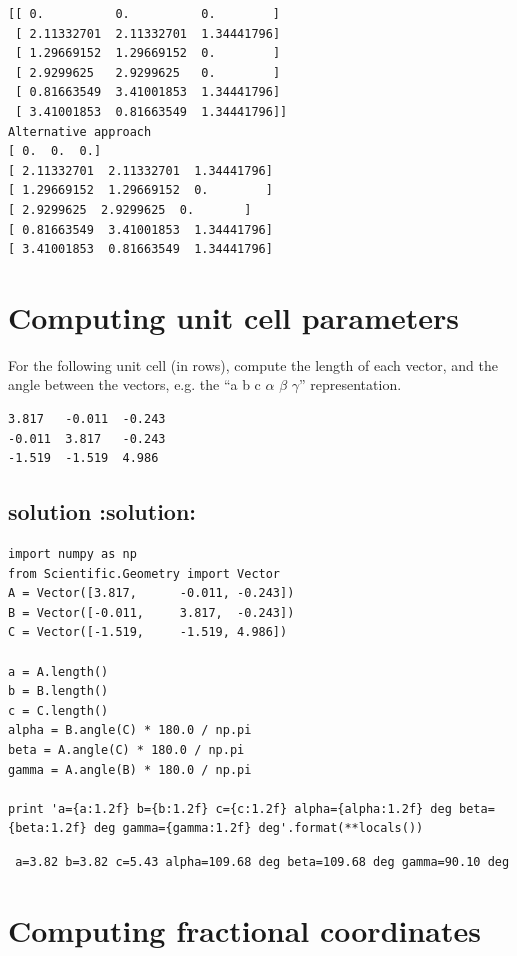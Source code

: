 \documentclass{article}
\begin{document}
\begin{verbatim}
[[ 0.          0.          0.        ]
 [ 2.11332701  2.11332701  1.34441796]
 [ 1.29669152  1.29669152  0.        ]
 [ 2.9299625   2.9299625   0.        ]
 [ 0.81663549  3.41001853  1.34441796]
 [ 3.41001853  0.81663549  1.34441796]]
Alternative approach
[ 0.  0.  0.]
[ 2.11332701  2.11332701  1.34441796]
[ 1.29669152  1.29669152  0.        ]
[ 2.9299625  2.9299625  0.       ]
[ 0.81663549  3.41001853  1.34441796]
[ 3.41001853  0.81663549  1.34441796]
\end{verbatim}
\section{Computing unit cell parameters}
\label{sec-4}

For the following unit cell (in rows), compute the length of each vector, and the angle between the vectors, e.g. the ``a b c $\alpha$ $\beta$ $\gamma$'' representation. 


\begin{verbatim}
3.817   -0.011  -0.243
-0.011  3.817   -0.243
-1.519  -1.519  4.986
\end{verbatim}
\subsection{solution \textbf{:solution:}}
\label{sec-4-1}


\begin{verbatim}
import numpy as np
from Scientific.Geometry import Vector
A = Vector([3.817,      -0.011, -0.243])
B = Vector([-0.011,     3.817,  -0.243])
C = Vector([-1.519,     -1.519, 4.986])

a = A.length()
b = B.length()
c = C.length()
alpha = B.angle(C) * 180.0 / np.pi
beta = A.angle(C) * 180.0 / np.pi
gamma = A.angle(B) * 180.0 / np.pi

print 'a={a:1.2f} b={b:1.2f} c={c:1.2f} alpha={alpha:1.2f} deg beta={beta:1.2f} deg gamma={gamma:1.2f} deg'.format(**locals())
\end{verbatim}

\begin{verbatim}
 a=3.82 b=3.82 c=5.43 alpha=109.68 deg beta=109.68 deg gamma=90.10 deg
\end{verbatim}
\section{Computing fractional coordinates}
\label{sec-5}
\end{document}

